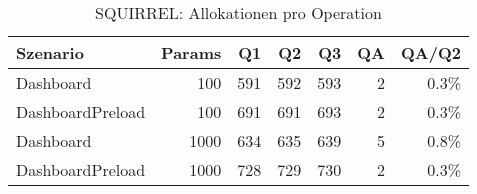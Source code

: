 \begin{table}[ht]
\centering
\caption{SQUIRREL: Allokationen pro Operation}
\begin{tabular}{lrrrrrr}
\toprule
Szenario & Params & Q1 & Q2 & Q3 & QA & QA/Q2 \\
\midrule
		Dashboard & 100 & 591 & 592 & 593 & 2 & 0.3\% \\
		DashboardPreload & 100 & 691 & 691 & 693 & 2 & 0.3\% \\
		Dashboard & 1000 & 634 & 635 & 639 & 5 & 0.8\% \\
		DashboardPreload & 1000 & 728 & 729 & 730 & 2 & 0.3\% \\
\bottomrule
\end{tabular}
\label{tab:benchmark_squirrel_allocsperop}
\end{table}
	